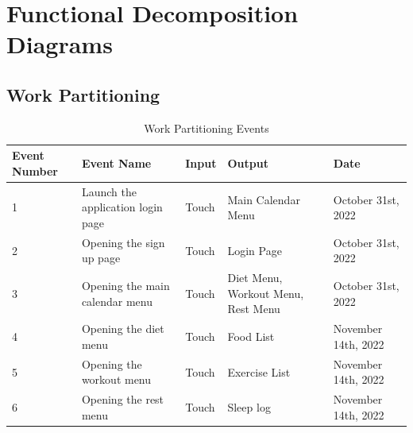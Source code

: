 \documentclass[12pt,letterpaper]{article}
\begin{document}
\section{Functional Decomposition Diagrams}

\subsection{Work Partitioning}
\begin{table}[h!]
\caption{Work Partitioning Events}
\centering
\begin{tabularx}{\columnwidth}{|X|X|X|X|X|}
	\hline
	\centering\textbf{Event Number} & \centering\textbf{Event Name} & \centering\textbf{Input} & \centering\textbf{Output} & \textbf{Date}\\
	\hline
	1 & Launch the application login page & Touch & Main Calendar Menu & October 31st, 2022\\
	\hline
	2 & Opening the sign up page & Touch & Login Page & October 31st, 2022\\
	\hline
	3 & Opening the main calendar menu & Touch & Diet Menu, Workout Menu, Rest Menu & October 31st, 2022\\
	\hline
	4 & Opening the diet menu  & Touch & Food List & November 14th, 2022\\
	\hline
	5 & Opening the workout menu & Touch & Exercise List & November 14th, 2022\\
	\hline
	6 & Opening the rest menu & Touch & Sleep log &  November 14th, 2022\\
	\hline
\end{tabularx}
\end{table}
\end{document}
